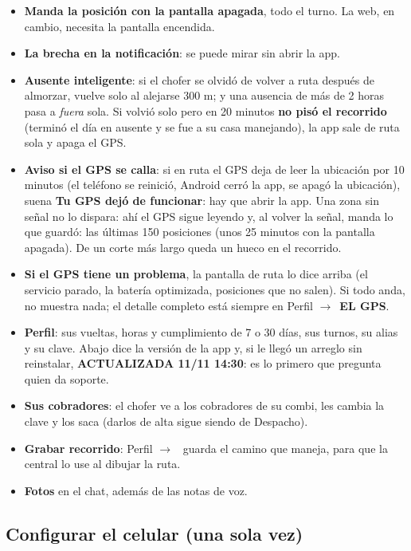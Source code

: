 \documentclass[11pt,a4paper,oneside]{book}
\newcommand{\boton}[1]{\tcbox[on line,boxsep=0pt,left=3pt,right=3pt,top=1.5pt,bottom=1.5pt,
  colback=white,colframe=linea,boxrule=0.5pt,arc=2pt]{\footnotesize\bfseries\color{tinta2}#1}}
\newcommand{\rotulo}[1]{{\footnotesize\bfseries\color{tinta2}\MakeUppercase{#1}}}
\newcommand{\enambar}[1]{{\color{ambar}\bfseries #1}}
\newcommand{\flecha}{$\rightarrow$\ }
\begin{document}
\begin{itemize}
  \item \textbf{Manda la posición con la pantalla apagada}, todo el turno. La
    web, en cambio, necesita la pantalla encendida.
  \item \textbf{La brecha en la notificación}: se puede mirar sin abrir la app.
  \item \textbf{Ausente inteligente}: si el chofer se olvidó de volver a ruta
    después de almorzar, vuelve solo al alejarse 300 m; y una ausencia de más
    de 2 horas pasa a \emph{fuera} sola. Si volvió solo pero en 20 minutos
    \textbf{no pisó el recorrido} (terminó el día en ausente y se fue a su
    casa manejando), la app sale de ruta sola y apaga el GPS.
  \item \textbf{Aviso si el GPS se calla}: si en ruta el GPS deja de leer la
    ubicación por 10 minutos (el teléfono se reinició, Android cerró la app,
    se apagó la ubicación), suena \enambar{Tu GPS dejó de funcionar}: hay
    que abrir la app. Una zona sin señal no lo dispara: ahí el GPS sigue
    leyendo y, al volver la señal, manda lo que guardó: las últimas 150
    posiciones (unos 25 minutos con la pantalla apagada). De un corte más
    largo queda un hueco en el recorrido.
  \item \textbf{Si el GPS tiene un problema}, la pantalla de ruta lo dice
    arriba (el servicio parado, la batería optimizada, posiciones que no
    salen). Si todo anda, no muestra nada; el detalle completo está siempre en
    Perfil \flecha \rotulo{EL GPS}.
  \item \textbf{Perfil}: sus vueltas, horas y cumplimiento de 7 o 30 días, sus
    turnos, su alias y su clave. Abajo dice la versión de la app y, si le
    llegó un arreglo sin reinstalar, \rotulo{actualizada 11/11 14:30}: es lo
    primero que pregunta quien da soporte.
  \item \textbf{Sus cobradores}: el chofer ve a los cobradores de su combi, les
    cambia la clave y los saca (darlos de alta sigue siendo de Despacho).
  \item \textbf{Grabar recorrido}: Perfil \flecha \boton{GRABAR RECORRIDO}
    guarda el camino que maneja, para que la central lo use al dibujar la ruta.
  \item \textbf{Fotos} en el chat, además de las notas de voz.
\end{itemize}

\subsection{Configurar el celular (una sola vez)}
\label{sec:configurar}
\end{document}
